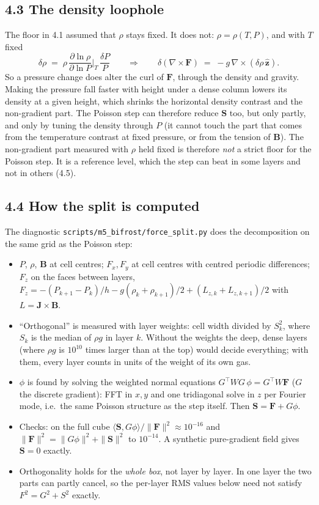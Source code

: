 \documentclass[10pt]{extarticle}
\newcommand{\B}{\mathbf B}\newcommand{\J}{\mathbf J}\newcommand{\F}{\mathbf F}\newcommand{\zh}{\hat{\mathbf z}}
\begin{document}
\subsection*{4.3 The density loophole}
The floor in 4.1 assumed that $\rho$ stays fixed. It does not: $\rho=\rho(T,P)$, and with $T$ fixed
\[
\delta\rho \;=\; \rho\,\frac{\partial\ln\rho}{\partial\ln P}\Big|_T\,\frac{\delta P}{P}
\qquad\Rightarrow\qquad
\delta(\nabla\times\F) \;=\; -g\,\nabla\times(\delta\rho\,\zh) .
\]
So a pressure change does alter the curl of $\F$, through the density and gravity. Making the pressure fall faster with
height under a dense column lowers its density at a given height, which shrinks the horizontal density contrast and the
non-gradient part. The Poisson step can therefore reduce $\mathbf S$ too, but only partly, and only by tuning the density
through $P$ (it cannot touch the part that comes from the temperature contrast at fixed pressure, or from the tension of $\B$).
The non-gradient part measured with $\rho$ held fixed is therefore \emph{not} a strict floor for the Poisson step. It is a
reference level, which the step can beat in some layers and not in others (4.5).

\subsection*{4.4 How the split is computed}
The diagnostic \texttt{scripts/m5\_bifrost/force\_split.py} does the decomposition on the same grid as the Poisson step:
\begin{itemize}
\item $P$, $\rho$, $\B$ at cell centres; $F_x,F_y$ at cell centres with centred periodic differences; $F_z$ on the faces
between layers, $F_z=-(P_{k+1}-P_k)/h-g(\rho_k+\rho_{k+1})/2+(L_{z,k}+L_{z,k+1})/2$ with $L=\J\times\B$.
\item ``Orthogonal'' is measured with layer weights: cell width divided by $S_k^2$, where $S_k$ is the median of $\rho g$
in layer $k$. Without the weights the deep, dense layers (where $\rho g$ is $10^{10}$ times larger than at the top) would
decide everything; with them, every layer counts in units of the weight of its own gas.
\item $\phi$ is found by solving the weighted normal equations $G^{\top}WG\,\phi=G^{\top}W\F$ ($G$ the discrete gradient):
FFT in $x,y$ and one tridiagonal solve in $z$ per Fourier mode, i.e.\ the same Poisson structure as the step itself.
Then $\mathbf S=\F+G\phi$.
\item Checks: on the full cube $\langle\mathbf S,G\phi\rangle/\|\F\|^2\approx10^{-16}$ and
$\|\F\|^2=\|G\phi\|^2+\|\mathbf S\|^2$ to $10^{-14}$. A synthetic pure-gradient field gives $\mathbf S=0$ exactly.
\item Orthogonality holds for the \emph{whole box}, not layer by layer. In one layer the two parts can partly cancel, so
the per-layer RMS values below need not satisfy $F^2=G^2+S^2$ exactly.
\end{itemize}
\end{document}
